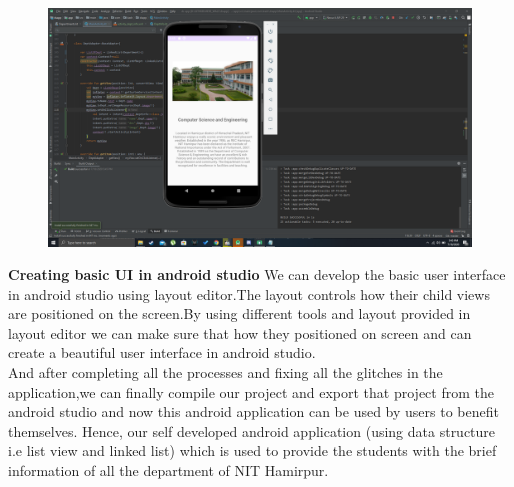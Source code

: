 \documentclass[11pt,a4paper]{report}
\begin{document}
 	 	   \vskip 3cm
 	 	   \begin{figure}[H]
 	 	       \centering
 	 	       \includegraphics[scale=0.24]{Screenshot_60.png}
 	 	   \end{figure}
 	 	   \vskip 7cm
 	 	   \textbf{\large{Creating basic UI in android studio}}
 	 	   \vskip 0.5cm
 	 	   We can develop the basic user interface in android studio using layout editor.The layout controls how their child views are positioned on the screen.By using different tools and layout provided in layout editor we can make sure that how they positioned on screen and can create a beautiful user interface in android studio.\\
 	 	   \vskip 0.5cm
 	 	   And after completing all the processes and fixing all the glitches in the application,we can finally compile our project and export that project from the android studio and now this android application can be used by users to benefit themselves.
 	 	   Hence, our self developed android application (using data structure i.e list view and linked list) which is used to provide the students with the brief information of all the department of NIT Hamirpur.
		\vskip 30cm
\end{document}
